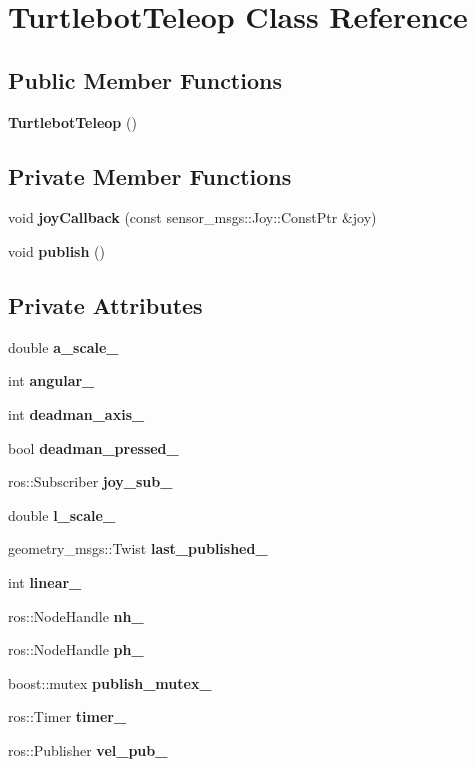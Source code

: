 \section{\-Turtlebot\-Teleop \-Class \-Reference}
\label{classTurtlebotTeleop}
\subsection*{\-Public \-Member \-Functions}
\begin{DoxyCompactItemize}
\item 
{\bf \-Turtlebot\-Teleop} ()
\end{DoxyCompactItemize}
\subsection*{\-Private \-Member \-Functions}
\begin{DoxyCompactItemize}
\item 
void {\bf joy\-Callback} (const sensor\-\_\-msgs\-::\-Joy\-::\-Const\-Ptr \&joy)
\item 
void {\bf publish} ()
\end{DoxyCompactItemize}
\subsection*{\-Private \-Attributes}
\begin{DoxyCompactItemize}
\item 
double {\bf a\-\_\-scale\-\_\-}
\item 
int {\bf angular\-\_\-}
\item 
int {\bf deadman\-\_\-axis\-\_\-}
\item 
bool {\bf deadman\-\_\-pressed\-\_\-}
\item 
ros\-::\-Subscriber {\bf joy\-\_\-sub\-\_\-}
\item 
double {\bf l\-\_\-scale\-\_\-}
\item 
geometry\-\_\-msgs\-::\-Twist {\bf last\-\_\-published\-\_\-}
\item 
int {\bf linear\-\_\-}
\item 
ros\-::\-Node\-Handle {\bf nh\-\_\-}
\item 
ros\-::\-Node\-Handle {\bf ph\-\_\-}
\item 
boost\-::mutex {\bf publish\-\_\-mutex\-\_\-}
\item 
ros\-::\-Timer {\bf timer\-\_\-}
\item 
ros\-::\-Publisher {\bf vel\-\_\-pub\-\_\-}
\end{DoxyCompactItemize}


